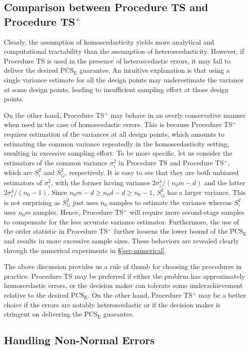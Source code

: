 \documentclass[ijoc,nonblindrev]{informs3}
\def\PCSE{\mathrm{PCS}_{\mathrm{E}}}
\begin{document}
\subsection{Comparison between Procedure TS and Procedure TS$^+$}
Clearly,  the  assumption of homoscedasticity yields more analytical and computational tractability than the assumption of heteroscedasticity.
However, if Procedure TS is used in the presence of heteroscedastic errors, it may fail to deliver the desired $\PCSE$ guarantee.
An intuitive explanation is that using a single variance estimate for all the design points may underestimate the variance at some design points, leading to insufficient sampling effort at those design points.

On the other hand, Procedure TS$^+$ may behave in an overly conservative manner when used in the case of homoscedastic errors.
This is because Procedure TS$^+$ requires estimation of the variances at all design points, which amounts to estimating the common variance repeatedly in the homoscedasticity setting, resulting in excessive sampling effort.
To be more specific, let us consider the estimators of the common variance $\sigma_i^2$ in Procedure TS and Procedure TS$^+$, which are $S_i^2$ and $S_{ij}^2$, respectively.
It is easy to see that they are both unbiased estimators of $\sigma_i^2$,
with the former having variance $2\sigma_i^4/(n_0m-d)$ and the latter $2\sigma_i^4/(n_0-1)$.
Since $n_0m-d \geq n_0d-d \geq n_0-1$, $S_{ij}^2$ has a larger variance.
This is not surprising as $S_{ij}^2$ just uses $n_0$ samples to estimate the variance whereas $S_i^2$ uses $n_0m$ samples.
Hence, Procedure TS$^+$ will require more second-stage samples to compensate for the less accurate variance estimator.
Furthermore, the use of the order statistic in Procedure TS$^+$ further loosens the lower bound of the $\PCSE$ and results in more excessive sample sizes.
These behaviors are revealed clearly through the numerical experiments in \S\ref{sec-numerical}.


The above discussion provides us a rule of thumb for choosing the procedures in practice.
Procedure TS may be preferred if either the problem has approximately homoscedastic errors, or the decision maker can tolerate some underachievement relative to the desired $\PCSE$.
On the other hand, Procedure TS$^+$ may be a better choice if the errors are notably heteroscedastic or if the decision maker is stringent on delivering the $\PCSE$ guarantee.

\subsection{Handling Non-Normal Errors}
\end{document}
